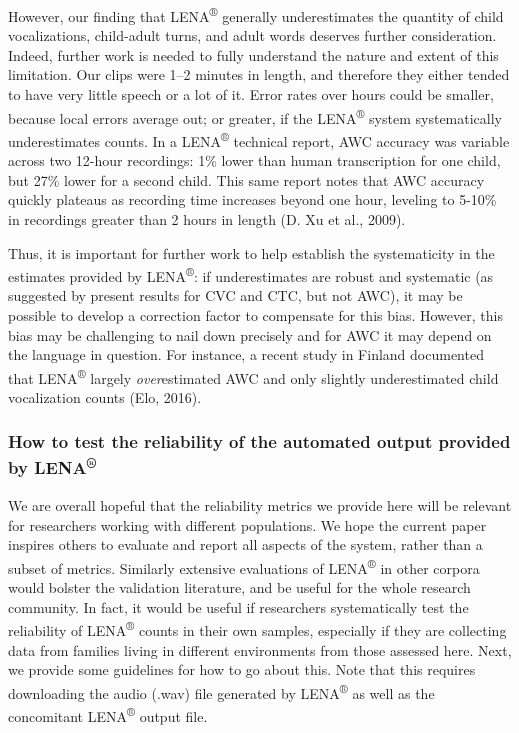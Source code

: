 \documentclass[english,floatsintext,man]{apa6}
\begin{document}
However, our finding that LENA\textsuperscript{®} generally
underestimates the quantity of child vocalizations, child-adult turns,
and adult words deserves further consideration. Indeed, further work is
needed to fully understand the nature and extent of this limitation. Our
clips were 1--2 minutes in length, and therefore they either tended to
have very little speech or a lot of it. Error rates over hours could be
smaller, because local errors average out; or greater, if the
LENA\textsuperscript{®} system systematically underestimates counts. In
a LENA\textsuperscript{®} technical report, AWC accuracy was variable
across two 12-hour recordings: 1\% lower than human transcription for
one child, but 27\% lower for a second child. This same report notes
that AWC accuracy quickly plateaus as recording time increases beyond
one hour, leveling to 5-10\% in recordings greater than 2 hours in
length (D. Xu et al., 2009).

Thus, it is important for further work to help establish the
systematicity in the estimates provided by LENA\textsuperscript{®}: if
underestimates are robust and systematic (as suggested by present
results for CVC and CTC, but not AWC), it may be possible to develop a
correction factor to compensate for this bias. However, this bias may be
challenging to nail down precisely and for AWC it may depend on the
language in question. For instance, a recent study in Finland documented
that LENA\textsuperscript{®} largely \emph{over}estimated AWC and only
slightly underestimated child vocalization counts (Elo, 2016).

\subsubsection{\texorpdfstring{How to test the reliability of the
automated output provided by
LENA\textsuperscript{®}}{How to test the reliability of the automated output provided by LENA®}}\label{how-to-test-the-reliability-of-the-automated-output-provided-by-lena}

We are overall hopeful that the reliability metrics we provide here will
be relevant for researchers working with different populations. We hope
the current paper inspires others to evaluate and report all aspects of
the system, rather than a subset of metrics. Similarly extensive
evaluations of LENA\textsuperscript{®} in other corpora would bolster
the validation literature, and be useful for the whole research
community. In fact, it would be useful if researchers systematically
test the reliability of LENA\textsuperscript{®} counts in their own
samples, especially if they are collecting data from families living in
different environments from those assessed here. Next, we provide some
guidelines for how to go about this. Note that this requires downloading
the audio (.wav) file generated by LENA\textsuperscript{®} as well as
the concomitant LENA\textsuperscript{®} output file.
\end{document}
